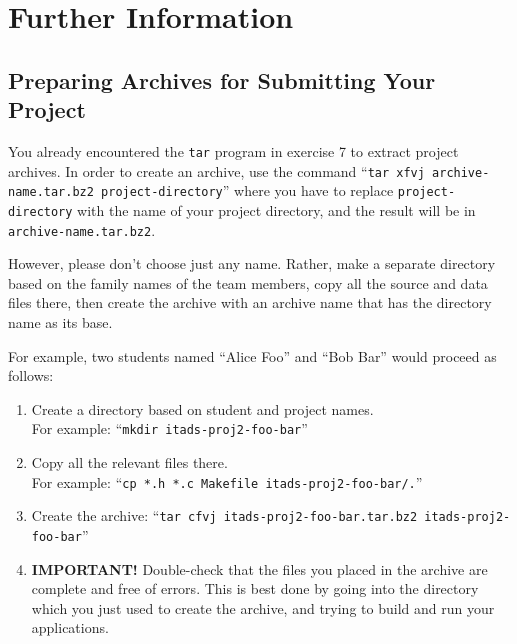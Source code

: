 \documentclass[a4paper,10pt]{article}
\begin{document}
\section{Further Information}

\subsection*{Preparing Archives for Submitting Your Project}

You already encountered the \texttt{tar} program in exercise 7 to extract project archives.
In order to create an archive, use the command ``\texttt{tar xfvj archive-name.tar.bz2 project-directory}'' where you have to replace \texttt{project-directory} with the name of your project directory, and the result will be in \texttt{archive-name.tar.bz2}.

However, please don't choose just any name.
Rather, make a separate directory based on the family names of the team members, copy all the source and data files there, then create the archive with an archive name that has the directory name as its base.

For example, two students named ``Alice Foo'' and ``Bob Bar'' would proceed as follows:
\begin{enumerate}
\item
  Create a directory based on student and project names.\\
  For example: ``\texttt{mkdir itads-proj2-foo-bar}''
\item
  Copy all the relevant files there.\\
  For example: ``\texttt{cp *.h *.c Makefile itads-proj2-foo-bar/.}''
\item
  Create the archive: ``\texttt{tar cfvj itads-proj2-foo-bar.tar.bz2 itads-proj2-foo-bar}''
\item
  \textbf{IMPORTANT!}
  Double-check that the files you placed in the archive are complete and free of errors.
  This is best done by going into the directory which you just used to create the archive, and trying to build and run your applications.
\end{enumerate}



\footnotesize


\end{document}

